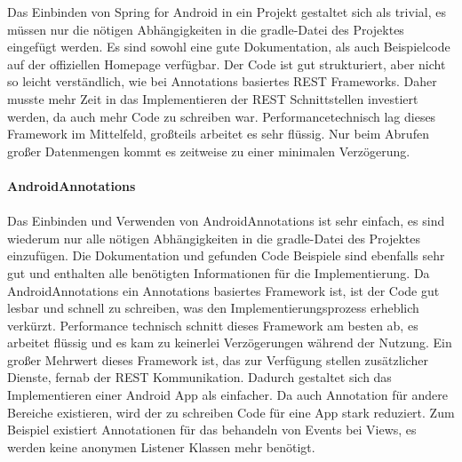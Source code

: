 Das Einbinden von Spring for Android in ein Projekt gestaltet sich als trivial, es müssen nur die nötigen Abhängigkeiten in die gradle-Datei des Projektes eingefügt werden. Es sind sowohl eine gute Dokumentation, als auch Beispielcode auf der offiziellen Homepage verfügbar. Der Code ist gut strukturiert, aber nicht so leicht verständlich, wie bei Annotations basiertes REST Frameworks. Daher musste mehr Zeit in das Implementieren der REST Schnittstellen investiert werden, da auch mehr Code zu schreiben war.  Performancetechnisch lag dieses Framework im Mittelfeld, großteils arbeitet es sehr flüssig. Nur beim Abrufen großer Datenmengen kommt es zeitweise zu einer minimalen Verzögerung.
\\\\
{\large \textbf{AndroidAnnotations}}\\\\
Das Einbinden und Verwenden von AndroidAnnotations ist sehr einfach, es sind wiederum nur alle nötigen Abhängigkeiten in die gradle-Datei des Projektes einzufügen. Die Dokumentation und gefunden Code Beispiele sind ebenfalls sehr gut und enthalten alle benötigten Informationen für die Implementierung. Da AndroidAnnotations ein Annotations basiertes Framework ist, ist der Code gut lesbar und schnell zu schreiben, was den Implementierungsprozess erheblich verkürzt. Performance technisch schnitt dieses Framework am besten ab, es arbeitet flüssig und es kam zu keinerlei Verzögerungen während der Nutzung. Ein großer Mehrwert dieses Framework ist, das zur Verfügung stellen zusätzlicher Dienste, fernab der REST Kommunikation. Dadurch gestaltet sich das Implementieren einer Android App als einfacher. Da auch Annotation für andere Bereiche existieren, wird der zu schreiben Code für eine App stark reduziert. Zum Beispiel existiert Annotationen für das behandeln von Events bei Views, es werden keine anonymen Listener Klassen mehr benötigt.